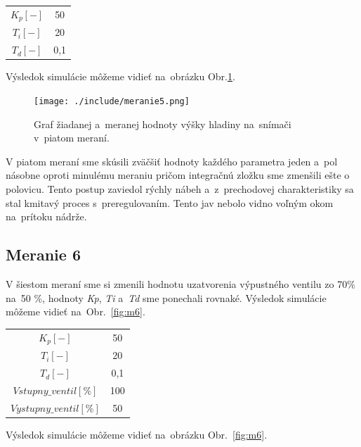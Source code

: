 \documentclass{article}
\begin{document}
\begin{center}
\begin{tabular}{ |c|c| }
 \hline
 $K_p [-]$ & 50 \\
 $T_i [-]$ & 20 \\
 $T_d [-]$ & 0,1 \\
 \hline
\end{tabular}
\end{center}

Výsledok simulácie môžeme vidieť na~obrázku Obr.\ref{fig:m5}.

\begin{figure}[!htbp]
	\begin{center}
		\texttt{[image: ./include/meranie5.png]}
	\end{center}
	\caption{Graf žiadanej a~meranej hodnoty výšky hladiny na~snímači v~piatom meraní.}
	\label{fig:m5}
\end{figure}

V piatom meraní sme skúsili zväčšiť hodnoty každého parametra jeden a~pol násobne oproti minulému meraniu 
pričom integračnú zložku sme zmenšili ešte o polovicu. Tento postup zaviedol rýchly nábeh a~z~prechodovej
charakteristiky sa stal kmitavý proces s~preregulovaním. Tento jav nebolo vidno voľným okom na~prítoku nádrže.

\clearpage

\subsection{Meranie 6}
\label{sec:meranie6}

V šiestom meraní sme si zmenili hodnotu uzatvorenia výpustného ventilu zo 70\% na~50 \%, hodnoty
\textit{Kp}, \textit{Ti} a~\textit{Td} sme ponechali rovnaké. Výsledok simulácie môžeme vidieť na~Obr.~\ref{fig:m6}.

\begin{center}
\begin{tabular}{ |c|c| }
 \hline
 $K_p [-]$ & 50 \\
 $T_i [-]$ & 20 \\
 $T_d [-]$ & 0,1 \\
 \hline
 $Vstupny\_ventil[\%]$ & 100 \\
 $Vystupny\_ventil[\%]$ & 50 \\
 \hline
\end{tabular}
\end{center}

Výsledok simulácie môžeme vidieť na~obrázku Obr.~\ref{fig:m6}.
\end{document}
